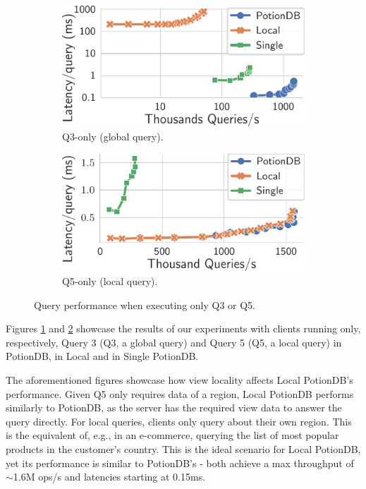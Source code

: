 \documentclass[sigconf, nonacm]{acmart}
\begin{document}
\begin{figure}
	\centering
	\begin{subfigure}{.49\linewidth}
		\includegraphics[width=1\linewidth]{singleQuery/q3_latency}
		\caption{Q3-only (global query).}
		\label{fig:q3_tc}
	\end{subfigure}%
	\hspace*{0.2em}
	\begin{subfigure}{.49\linewidth}
		\includegraphics[width=1\linewidth]{singleQuery/q5_latency}
		\caption{Q5-only (local query).}
		\label{fig:q5_tc}
	\end{subfigure}%
	\vspace*{-0.55em}
	\caption{Query performance when executing only Q3 or Q5.}
	\label{fig:q3_q5_tc}
	\vspace*{-1.1em}
\end{figure}

Figures \ref{fig:q3_tc} and \ref{fig:q5_tc} showcase the results of our experiments with clients running only, respectively, Query 3 (Q3, a global query) and Query 5 (Q5, a local query) in PotionDB, in Local and in Single PotionDB.

The aforementioned figures showcase how view locality affects Local PotionDB's performance.
Given Q5 only requires data of a region, Local PotionDB performs similarly to PotionDB, as the server has the required view data to answer the query directly.
For local queries, clients only query about their own region.
This is the equivalent of, e.g., in an e-commerce, querying the list of most popular products in the customer's country.
This is the ideal scenario for Local PotionDB, yet its performance is similar to PotionDB's - both achieve a max throughput of $\sim$1.6M ops/s and latencies starting at 0.15ms.
\end{document}
